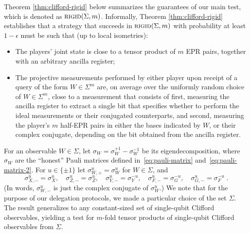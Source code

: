 \documentclass[11pt]{article}
\newcommand{\rigid}{\textsc{rigid}}
\begin{document}
Theorem \ref{thm:clifford-rigid} below summarizes the guarantees of our main
test, which is denoted as $\rigid(\Sigma,m)$. Informally, Theorem \ref{thm:clifford-rigid} establishes that a strategy that succeeds in $\rigid(\Sigma,m)$ with probability at least  $1-\epsilon$ must be such that (up to local isometries):
\begin{itemize}
    \item The players' joint state is close to a tensor product of $m$ EPR pairs, together with an arbitrary ancilla register;
    \item The projective measurements performed by either player upon receipt of a query of the form $W\in\Sigma^m$ are, on average over the uniformly random choice of $W\in\Sigma^m$, close to a measurement that consists of first, measuring the ancilla register to extract a single bit that specifies whether to perform the ideal measurements or their conjugated counterparts, and second, measuring the player's $m$ half-EPR pairs in either the bases indicated by $W$, or their complex conjugate, depending on the bit obtained from the ancilla register. 
\end{itemize}

For an observable $W\in\Sigma$, let $\sigma_W = \sigma_W^{+1} - \sigma_W^{-1}$ be its eigendecomposition, where $\sigma_W$ are the ``honest'' Pauli matrices defined in~\eqref{eq:pauli-matrix} and~\eqref{eq:pauli-matrix-2}. For $u\in\{\pm 1\}$ let $\sigma_{W,+}^u = \sigma_W^u$ for $W\in \Sigma$, and 
$$ \sigma_{X,-}^u = \sigma_X^u,\quad\sigma_{Z,-}^u = \sigma_Z^u,\quad\sigma_{Y,-}^u = \sigma_Y^{-u},\quad\sigma_{F,-}^u = \sigma_G^{-u},\quad\sigma_{G,-}^u = \sigma_F^{-u}\;.$$
(In words, $\sigma_{W,-}^u$ is just the complex conjugate of $\sigma_W^u$.) We note that for the purpose of our delegation protocols, we made a particular choice of the set $\Sigma$. The result generalizes to any constant-sized set of single-qubit Clifford observables,  yielding a test for $m$-fold tensor products of single-qubit Clifford observables from $\Sigma$.
\end{document}
